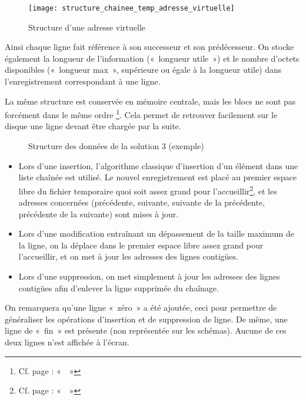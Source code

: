 \begin{figure}[H]
	\centering
	\texttt{[image: structure\_chainee\_temp\_adresse\_virtuelle]}
	\caption{Structure d'une adresse virtuelle}
\end{figure}

Ainsi chaque ligne fait référence à son successeur et son prédécesseur. On stocke également la longueur de l'information («~longueur utile~») et le nombre d'octets disponibles («~longueur max~», supérieure ou égale à la longueur utile) dans l'enregistrement correspondant à une ligne.

La même structure est conservée en mémoire centrale, mais les blocs ne sont pas forcément dans le même ordre \footnote{Cf. page \pageref{subsec:gestionblocs} : «~~»}. Cela permet de retrouver facilement sur le disque une ligne devant être chargée par la suite.

\begin{figure}[H]
	\centering
	\caption{Structure des données de la solution 3 (exemple)}
\end{figure}

\begin{itemize}
	\item Lors d'une insertion, l'algorithme classique d'insertion d'un élément dans une liste chaînée est utilisé. Le nouvel enregistrement est placé au premier espace libre du fichier temporaire quoi soit assez grand pour l'accueillir\footnote{Cf. page \pageref{subsec:gestionespacelibre} : «~~»}, et les adresses concernées (précédente, suivante, suivante de la précédente, précédente de la suivante) sont mises à jour.
	\item Lors d'une modification entraînant un dépassement de la taille maximum de la ligne, on la déplace dans le premier espace libre assez grand pour l'accueillir, et on met à jour les adresses des lignes contigües.
	\item Lors d'une suppression, on met simplement à jour les adresses des lignes contigües afin d'enlever la ligne supprimée du chaînage.
\end{itemize}

On remarquera qu'une ligne «~zéro~» a été ajoutée, ceci pour permettre de généraliser les opérations d'insertion et de suppression de ligne. De même, une ligne de «~fin~» est présente (non représentée sur les schémas). Aucune de ces deux lignes n'est affichée à l'écran.


